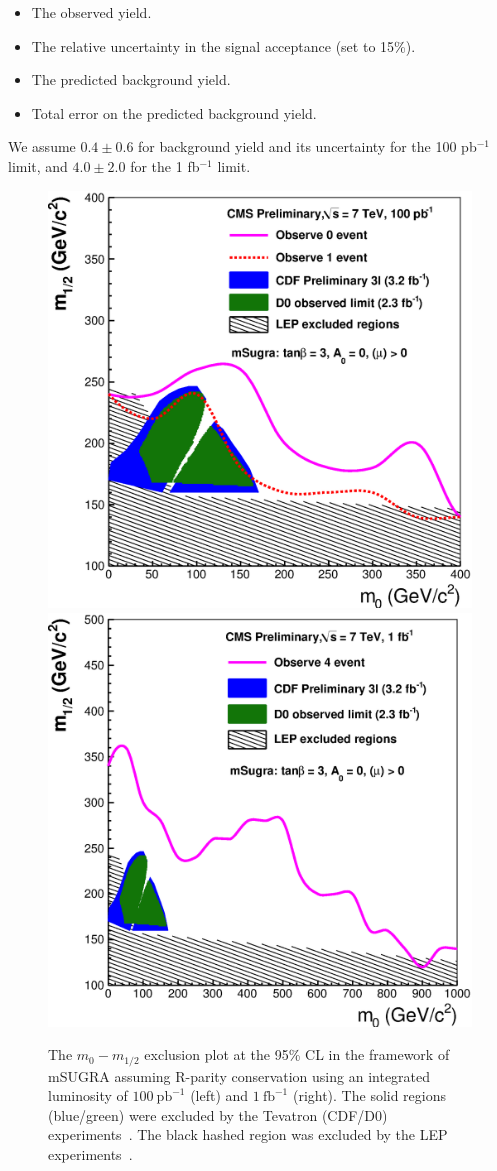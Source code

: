 \begin{itemize}
\item The observed yield.
\item The relative  uncertainty in  the  signal acceptance (set  to 15\%).
\item The predicted  background yield.
\item Total  error  on the  predicted background yield.
\end{itemize}
We assume $0.4 \pm 0.6$ for background yield and its uncertainty for the 100 pb$^{-1}$ limit, and
$4.0\pm 2.0$ for the 1 fb$^{-1}$ limit.
\vspace{3 mm}
\begin{figure}[htb]
\begin{center}

\includegraphics[width=0.485\linewidth]{figs/exclusion100ss.eps}
\includegraphics[width=0.485\linewidth]{figs/exclusion1fbss.eps}
\caption{The $m_{0}-m_{1/2}$ exclusion plot at the 95\% CL in the framework of 
mSUGRA assuming R-parity conservation using an  integrated  luminosity of  
$100~\mathrm{pb}^{-1}$ (left) and $1~\mathrm{fb}^{-1}$ (right). The solid regions (blue/green) were
excluded by the Tevatron (CDF/D0) experiments~\cite{cdf:recentSusy, d0:recentSusy}. The black hashed region was excluded
by the LEP experiments~\cite{lep:lepsusyreach}.\label{fig:ss_exclusion}}

\end{center}
\end{figure}

